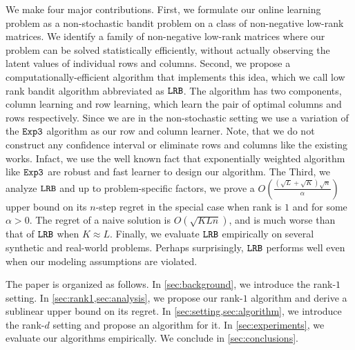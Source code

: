 We make four major contributions. First, we formulate our online learning problem as a non-stochastic bandit problem on a class of non-negative low-rank matrices. We identify a family of non-negative low-rank matrices where our problem can be solved statistically efficiently, without actually observing the latent values of individual rows and columns. Second, we propose a computationally-efficient algorithm that implements this idea, which we call low rank bandit algorithm abbreviated as ${\tt LRB}$. The algorithm has two components, column learning and row learning, which learn the pair  of optimal columns and rows respectively. Since we are in the non-stochastic setting we use a variation of the ${\tt Exp3}$ \citep{auer2002nonstochastic} algorithm as our row and column learner. Note, that we do not construct any confidence interval or eliminate rows and columns like the existing works. Infact, we use the well known fact that exponentially weighted algorithm like ${\tt Exp3}$ are robust and fast learner to design our algorithm. The Third, we analyze ${\tt LRB}$ and up to problem-specific factors, we prove a $O\left(\frac{\left(\sqrt{L } + \sqrt{K }\right)\sqrt{n}}{\alpha}\right)$ upper bound on its $n$-step regret in the special case when rank is $1$ and for some $\alpha > 0$. The regret of a naive solution is $O(\sqrt{K L n})$, and is much worse than that of ${\tt LRB}$ when $K \approx L$. Finally, we evaluate ${\tt LRB}$ empirically on several synthetic and real-world problems. Perhaps surprisingly, ${\tt LRB}$ performs well even when our modeling assumptions are violated.

The paper is organized as follows. In \cref{sec:background}, we introduce the rank-$1$ setting. In \cref{sec:rank1,sec:analysis}, we propose our rank-$1$ algorithm and derive a sublinear upper bound on its regret. In \cref{sec:setting,sec:algorithm}, we introduce the rank-$d$ setting and propose an algorithm for it. In \cref{sec:experiments}, we evaluate our algorithms empirically. We conclude in \cref{sec:conclusions}. 
